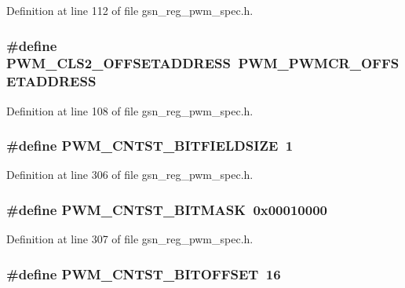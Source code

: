 Definition at line 112 of file gsn\_\-reg\_\-pwm\_\-spec.h.

\hypertarget{a00565_ad706dc65d2a9dfe96eea06384d13351f}{
\subsubsection[{PWM\_\-CLS2\_\-OFFSETADDRESS}]{\setlength{\rightskip}{0pt plus 5cm}\#define PWM\_\-CLS2\_\-OFFSETADDRESS~PWM\_\-PWMCR\_\-OFFSETADDRESS}}
\label{a00565_ad706dc65d2a9dfe96eea06384d13351f}


Definition at line 108 of file gsn\_\-reg\_\-pwm\_\-spec.h.

\hypertarget{a00565_a3b6674b72140ed31c824c747122cb5cb}{
\subsubsection[{PWM\_\-CNTST\_\-BITFIELDSIZE}]{\setlength{\rightskip}{0pt plus 5cm}\#define PWM\_\-CNTST\_\-BITFIELDSIZE~1}}
\label{a00565_a3b6674b72140ed31c824c747122cb5cb}


Definition at line 306 of file gsn\_\-reg\_\-pwm\_\-spec.h.

\hypertarget{a00565_a60cef3d409c8d64931e03cf348cbe8be}{
\subsubsection[{PWM\_\-CNTST\_\-BITMASK}]{\setlength{\rightskip}{0pt plus 5cm}\#define PWM\_\-CNTST\_\-BITMASK~0x00010000}}
\label{a00565_a60cef3d409c8d64931e03cf348cbe8be}


Definition at line 307 of file gsn\_\-reg\_\-pwm\_\-spec.h.

\hypertarget{a00565_ac937f242c18bb3a56b38d9a764db2d78}{
\subsubsection[{PWM\_\-CNTST\_\-BITOFFSET}]{\setlength{\rightskip}{0pt plus 5cm}\#define PWM\_\-CNTST\_\-BITOFFSET~16}}
\label{a00565_ac937f242c18bb3a56b38d9a764db2d78}


